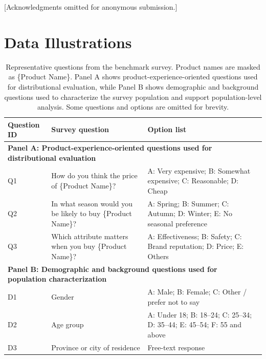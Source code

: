 \documentclass{article}
\begin{document}
\begin{ack}
[Acknowledgments omitted for anonymous submission.]
\end{ack}




\newpage

\appendix

\section{Data Illustrations}
\label{app:tables}

\begin{table}[htb!]
\centering
\small
\begin{tabular}{p{}p{}p{}}
\toprule
Question ID & Survey question & Option list \\
\midrule
\multicolumn{3}{l}{\textbf{Panel A: Product-experience-oriented questions used for distributional evaluation}} \\
\midrule
Q1 &
How do you think the price of \{Product Name\}? &
A: Very expensive; B: Somewhat expensive; C: Reasonable; D: Cheap \\

Q2 &
In what season would you be likely to buy \{Product Name\}? &
A: Spring; B: Summer; C: Autumn; D: Winter; E: No seasonal preference \\

Q3 &
Which attribute matters when you buy \{Product Name\}? &
A: Effectiveness; B: Safety; C: Brand reputation; D: Price; E: Others \\

\midrule
\multicolumn{3}{l}{\textbf{Panel B: Demographic and background questions used for population characterization}} \\
\midrule
D1 &
Gender &
A: Male; B: Female; C: Other / prefer not to say \\

D2 &
Age group &
A: Under 18; B: 18--24; C: 25--34; D: 35--44; E: 45--54; F: 55 and above \\

D3 &
Province or city of residence &
Free-text response \\

\bottomrule
\end{tabular}
\caption{Representative questions from the benchmark survey. Product names are masked as \{Product Name\}. Panel A shows product-experience-oriented questions used for distributional evaluation, while Panel B shows demographic and background questions used to characterize the survey population and support population-level analysis. Some questions and options are omitted for brevity.}
\label{tab:questions}
\end{table}
\end{document}
